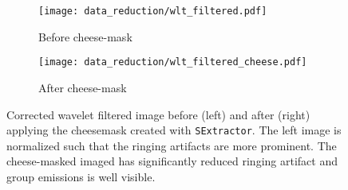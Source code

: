 \begin{figure}[htbp]
    \centering
    \begin{subfigure}[b]{0.48\textwidth}
        \centering
        \texttt{[image: data\_reduction/wlt\_filtered.pdf]}
        \caption{Before cheese-mask}
        \label{fig:wlt_filtered}
    \end{subfigure}
    \hfill
    \begin{subfigure}[b]{0.48\textwidth}
        \centering
        \texttt{[image: data\_reduction/wlt\_filtered\_cheese.pdf]}
        \caption{After cheese-mask}
        \label{fig:wvl_filtered_cheesed}
    \end{subfigure}
    \caption{Corrected wavelet filtered image before (left) and after (right) applying the cheesemask created with \texttt{SExtractor}. The left image is normalized such that the ringing artifacts are more prominent. The cheese-masked imaged has significantly reduced ringing artifact and group emissions is well visible.}
    \label{fig:comparison_wvl_filtered}
\end{figure}





